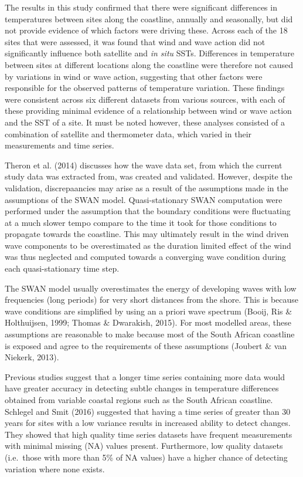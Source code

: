 \documentclass[12pt,A4paper,]{article}
\begin{document}
The results in this study confirmed that there were significant
differences in temperatures between sites along the coastline, annually
and seasonally, but did not provide evidence of which factors were
driving these. Across each of the 18 sites that were assessed, it was
found that wind and wave action did not significantly influence both
satellite and \emph{in situ} SSTs. Differences in temperature between
sites at different locations along the coastline were therefore not
caused by variations in wind or wave action, suggesting that other
factors were responsible for the observed patterns of temperature
variation. These findings were consistent across six different datasets
from various sources, with each of these providing minimal evidence of a
relationship between wind or wave action and the SST of a site. It must
be noted however, these analyses consisted of a combination of satellite
and thermometer data, which varied in their measurements and time
series.

Theron et al. (2014) discusses how the wave data set, from which the
current study data was extracted from, was created and validated.
However, despite the validation, discrepaancies may arise as a result of
the assumptions made in the assumptions of the SWAN model.
Quasi-stationary SWAN computation were performed under the assumption
that the boundary conditions were fluctuating at a much slower tempo
compare to the time it took for those conditions to propagate towards
the coastline. This may ultimately result in the wind driven wave
components to be overestimated as the duration limited effect of the
wind was thus neglected and computed towards a converging wave condition
during each quasi-stationary time step.

The SWAN model usually overestimates the energy of developing waves with
low frequencies (long periods) for very short distances from the shore.
This is because wave conditions are simplified by using an a priori wave
spectrum (Booij, Ris \& Holthuijsen, 1999; Thomas \& Dwarakish, 2015).
For most modelled areas, these assumptions are reasonable to make
because most of the South African coastline is exposed and agree to the
requirements of these assumptions (Joubert \& van Niekerk, 2013).

Previous studies suggest that a longer time series containing more data
would have greater accuracy in detecting subtle changes in temperature
differences obtained from variable coastal regions such as the South
African coastline. Schlegel and Smit (2016) suggested that having a time
series of greater than 30 years for sites with a low variance results in
increased ability to detect changes. They showed that high quality time
series datasets have frequent measurements with minimal missing (NA)
values present. Furthermore, low quality datasets (i.e.~those with more
than 5\% of NA values) have a higher chance of detecting variation where
none exists.
\end{document}
